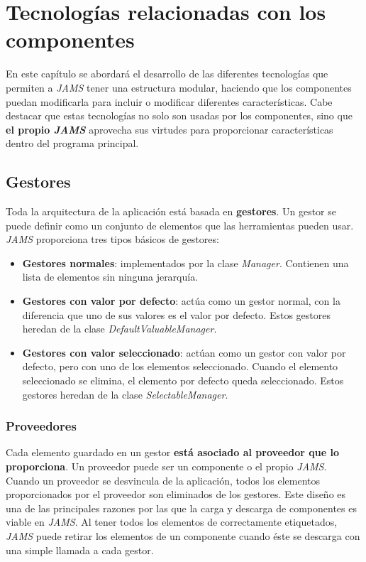 \chapter{Tecnologías relacionadas con los componentes}\label{ch:tecnologias-relacionadas-con-los-componentes}

En este capítulo se abordará el desarrollo de las
diferentes tecnologías que permiten a \textit{JAMS}
tener una estructura modular, haciendo que los
componentes puedan modificarla para incluir o modificar
diferentes características.
Cabe destacar que estas tecnologías no solo son usadas
por los componentes, sino que \textbf{el propio \textit{JAMS}}
aprovecha sus virtudes para proporcionar características
dentro del programa principal.


\section{Gestores}\label{sec:gestores}

Toda la arquitectura de la aplicación está basada en \textbf{gestores}.
Un gestor se puede definir como un conjunto de elementos que las herramientas pueden usar.
\textit{JAMS} proporciona tres tipos básicos de gestores:
\begin{itemize}
    \item \textbf{Gestores normales}: implementados por la clase \textit{Manager}.
    Contienen una lista de elementos sin ninguna jerarquía.
    \item \textbf{Gestores con valor por defecto}: actúa como un gestor normal, con la
    diferencia que uno de sus valores es el valor por defecto.
    Estos gestores heredan de la clase \textit{DefaultValuableManager}.
    \item \textbf{Gestores con valor seleccionado}: actúan como un gestor con valor por defecto,
    pero con uno de los elementos seleccionado.
    Cuando el elemento seleccionado se elimina, el elemento por defecto queda seleccionado.
    Estos gestores heredan de la clase \textit{SelectableManager}.
\end{itemize}

\subsection{Proveedores}\label{subsec:proveedores}

Cada elemento guardado en un gestor \textbf{está asociado al proveedor que lo proporciona}.
Un proveedor puede ser un componente o el propio \textit{JAMS}.
Cuando un proveedor se desvincula de la aplicación, todos los elementos proporcionados
por el proveedor son eliminados de los gestores.
Este diseño es una de las principales razones por las que la carga y descarga de
componentes es viable en \textit{JAMS}.
Al tener todos los elementos de correctamente etiquetados, \textit{JAMS}
puede retirar los elementos de un componente cuando éste se
descarga con una simple llamada a cada gestor.


